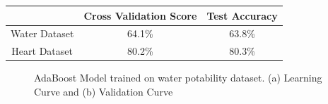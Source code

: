 \documentclass[
	letterpaper, %
]{mlreport}
\begin{document}
\begin{center}
	\begin{tabular}{|c||c|c|}
	 \hline
	  & Cross Validation Score & Test Accuracy \\
	 \hline\hline
	 Water Dataset & 64.1\%  & 63.8\% \\
	 \hline
	 Heart Dataset & 80.2\%  & 80.3\% \\
	 \hline
	\end{tabular}
	\label{table:table2}
\end{center}
\begin{figure}
	\centering
	\caption{AdaBoost Model trained on water potability dataset. (a) Learning Curve and (b) Validation Curve}
	\label{fig:fig5}
\end{figure}
\end{document}
